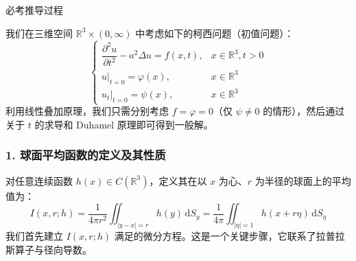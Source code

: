 \documentclass[12pt,a4paper]{ctexart}
\begin{document}
	必考推导过程

	我们在三维空间 $\mathbb{R}^3 \times (0, \infty)$ 中考虑如下的柯西问题（初值问题）：
	\begin{equation}
		\begin{cases}
			\dfrac{\partial^2 u}{\partial t^2} - a^2 \Delta u = f(x,t), & x \in \mathbb{R}^3, t > 0 \\
			u|_{t=0} = \varphi(x), & x \in \mathbb{R}^3 \\
			u_t|_{t=0} = \psi(x), & x \in \mathbb{R}^3
		\end{cases}
		\label{eq:wave_3d}
	\end{equation}
	利用线性叠加原理，我们只需分别考虑 $f=\varphi=0$（仅 $\psi \neq 0$ 的情形），然后通过关于 $t$ 的求导和 Duhamel 原理即可得到一般解。
	
	\subsubsection*{1. 球面平均函数的定义及其性质}
	
	对任意连续函数 $h(x) \in C(\mathbb{R}^3)$，定义其在以 $x$ 为心、$r$ 为半径的球面上的平均值为：
	\begin{equation}
		I(x,r;h) = \dfrac{1}{4\pi r^2} \iint_{|y-x|=r} h(y) \, \mathrm{d}S_y = \dfrac{1}{4\pi} \iint_{|\eta|=1} h(x+r\eta) \, \mathrm{d}S_\eta
		\label{eq:spherical_mean_def}
	\end{equation}
	我们首先建立 $I(x,r;h)$ 满足的微分方程。这是一个关键步骤，它联系了拉普拉斯算子与径向导数。
	
\end{document}
